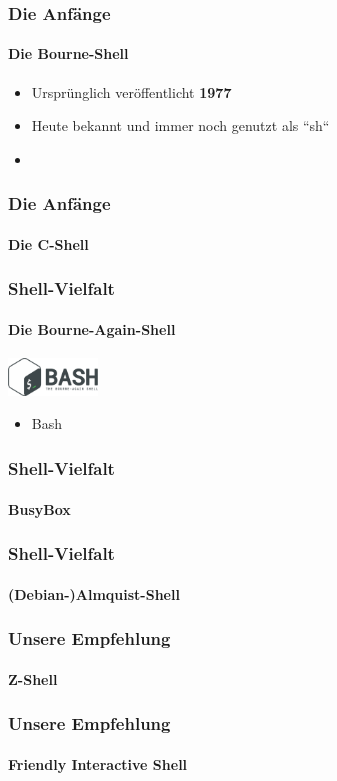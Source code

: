\documentclass[12pt,utf8]{beamer}
\begin{document}
	\begin{frame}
	\frametitle{Die Anfänge}
	\framesubtitle{Die Bourne-Shell}
	\begin{itemize}
		\item Ursprünglich veröffentlicht \textbf{1977}
		\item Heute bekannt und immer noch genutzt als ``sh``
		\item 
	\end{itemize}
	\end{frame}

	\begin{frame}
	\frametitle{Die Anfänge}
	\framesubtitle{Die C-Shell}
	\end{frame}

	\begin{frame}
	\frametitle{Shell-Vielfalt}
	\framesubtitle{Die Bourne-Again-Shell}
	\includegraphics[height=1cm]{res/bash.png}
	\begin{itemize}
		\item Bash
	\end{itemize}
	\end{frame}
	
	\begin{frame}
	\frametitle{Shell-Vielfalt}
	\framesubtitle{BusyBox}
	\end{frame}

	\begin{frame}
	\frametitle{Shell-Vielfalt}
	\framesubtitle{(Debian-)Almquist-Shell}
	\end{frame}

	\begin{frame}
	\frametitle{Unsere Empfehlung}
	\framesubtitle{Z-Shell}
	\end{frame}

	\begin{frame}
	\frametitle{Unsere Empfehlung}
	\framesubtitle{Friendly Interactive Shell}
	\end{frame}
\end{document}
